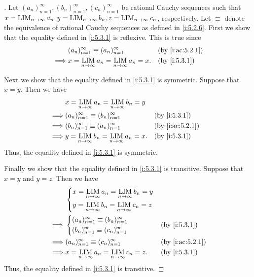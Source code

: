 \begin{proof}[]
  Let \((a_n)_{n = 1}^\infty, (b_n)_{n = 1}^\infty, (c_n)_{n = 1}^\infty\) be rational Cauchy sequences such that \(x = \operatorname*{LIM}_{n \to \infty} a_n, y = \operatorname*{LIM}_{n \to \infty} b_n, z = \operatorname*{LIM}_{n \to \infty} c_n\), respectively.
  Let \(\equiv\) denote the equivalence of rational Cauchy sequences as defined in \cref{i:5.2.6}.
  First we show that the equality defined in \cref{i:5.3.1} is reflexive.
  This is true since
  \begin{align*}
             & (a_n)_{n = 1}^\infty \equiv (a_n)_{n = 1}^\infty           &  & \by{i:ac:5.2.1} \\
    \implies & x = \LIM_{n \to \infty} a_n = \LIM_{n \to \infty} a_n = x. &  & \by{i:5.3.1}
  \end{align*}

  Next we show that the equality defined in \cref{i:5.3.1} is symmetric.
  Suppose that \(x = y\).
  Then we have
  \begin{align*}
             & x = \LIM_{n \to \infty} a_n = \LIM_{n \to \infty} b_n = y                       \\
    \implies & (a_n)_{n = 1}^\infty \equiv (b_n)_{n = 1}^\infty           &  & \by{i:5.3.1}    \\
    \implies & (b_n)_{n = 1}^\infty \equiv (a_n)_{n = 1}^\infty           &  & \by{i:ac:5.2.1} \\
    \implies & y = \LIM_{n \to \infty} b_n = \LIM_{n \to \infty} a_n = x. &  & \by{i:5.3.1}
  \end{align*}
  Thus, the equality defined in \cref{i:5.3.1} is symmetric.

  Finally we show that the equality defined in \cref{i:5.3.1} is transitive.
  Suppose that \(x = y\) and \(y = z\).
  Then we have
  \begin{align*}
             & \begin{dcases}x = \LIM_{n \to \infty} a_n = \LIM_{n \to \infty} b_n = y \\
                 y = \LIM_{n \to \infty} b_n = \LIM_{n \to \infty} c_n = z
               \end{dcases}                         \\
    \implies & \begin{dcases}
                 (a_n)_{n = 1}^\infty \equiv (b_n)_{n = 1}^\infty \\
                 (b_n)_{n = 1}^\infty \equiv (c_n)_{n = 1}^\infty \\
               \end{dcases}                        &  & \by{i:5.3.1}                                           \\
    \implies & (a_n)_{n = 1}^\infty \equiv (c_n)_{n = 1}^\infty                           &  & \by{i:ac:5.2.1} \\
    \implies & x = \LIM_{n \to \infty} a_n = \LIM_{n \to \infty} c_n = z.                 &  & \by{i:5.3.1}
  \end{align*}
  Thus, the equality defined in \cref{i:5.3.1} is transitive.
\end{proof}

